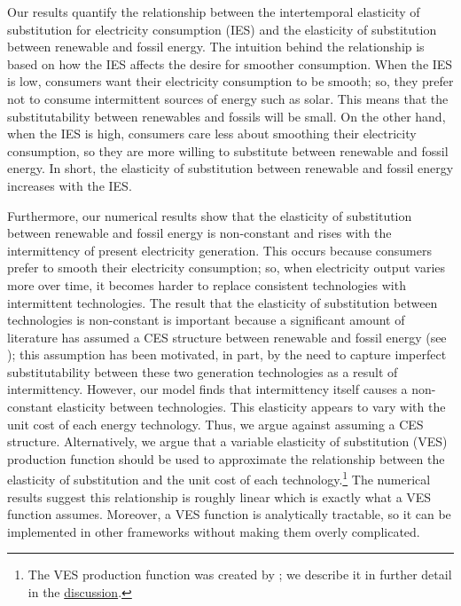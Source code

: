 \documentclass[11pt,a4paper,leqno]{extarticle}
\begin{document}
	
	Our results quantify the relationship between the intertemporal elasticity of substitution for electricity consumption  (IES) and the elasticity of substitution between renewable and fossil energy. The intuition behind the relationship is based on how the IES affects the desire for smoother consumption. When the IES is low, consumers want their electricity consumption to be smooth; so, they prefer not to consume intermittent sources of energy such as solar. This means that the substitutability between renewables and fossils will be small. On the other hand, when the IES is high, consumers care less about smoothing their electricity consumption, so they are more willing to substitute between renewable and fossil energy. In short, the elasticity of substitution between renewable and fossil energy increases with the IES. 
	
	Furthermore, our numerical results show that the elasticity of substitution between renewable and fossil energy is non-constant and rises with the intermittency of present electricity generation. This occurs because consumers prefer to smooth their electricity consumption; so, when electricity output varies more over time, it becomes harder to replace consistent technologies with intermittent technologies. The result that the elasticity of substitution between technologies is non-constant is important because a significant amount of literature has assumed a CES structure between renewable and fossil energy (see \citet{Pap}); this assumption has been motivated, in part, by the need to capture imperfect substitutability between these two generation technologies as a result of intermittency. However, our model finds that intermittency itself causes a non-constant elasticity between technologies. This elasticity appears to vary with the unit cost of each energy technology. Thus, we argue against assuming a CES structure. Alternatively, we argue  that a variable elasticity of substitution (VES) production function should be used to approximate the relationship  between the elasticity of substitution and the unit cost of each technology.\footnote{ The VES production function was created by \citet{VES}; we describe it in further detail in the \hyperref[sec:VES]{discussion}. } The numerical results suggest this relationship is roughly linear which is exactly what a VES function assumes. Moreover, a VES function is analytically tractable, so it can be implemented in other frameworks without making them overly complicated. 
	
\end{document}
